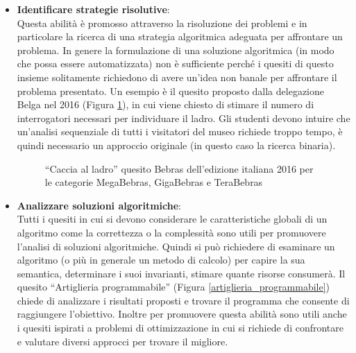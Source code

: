 \documentclass[12pt]{report}
\begin{document}
\begin{itemize}
\bigskip
	\item \textbf{Identificare strategie risolutive}:
	\\
	Questa abilità è promosso attraverso la risoluzione dei problemi e in particolare la ricerca di una strategia algoritmica adeguata per affrontare un problema. In genere la formulazione di una soluzione algoritmica (in modo che possa essere automatizzata) non è sufficiente perché i quesiti di questo insieme solitamente richiedono di avere un'idea non banale per affrontare il problema presentato.
	Un esempio è il quesito proposto dalla delegazione Belga nel 2016 (Figura \ref{2016-BE-02}), in cui viene chiesto di stimare il numero di interrogatori necessari per individuare il ladro. Gli studenti devono intuire che un'analisi sequenziale di tutti i visitatori del museo richiede troppo tempo, è quindi necessario un approccio originale (in questo caso la ricerca binaria). 
	
	\begin{figure}[h]
		\centering
		\caption{``Caccia al ladro'' quesito Bebras dell'edizione italiana 2016 per le categorie MegaBebras, GigaBebras e TeraBebras}\label{2016-BE-02}
	\end{figure}
	
\bigskip
	\item \textbf{Analizzare soluzioni algoritmiche}: 
	\\
	Tutti i quesiti in cui si devono considerare le caratteristiche globali di un algoritmo come la correttezza o la complessità sono utili per promuovere l'analisi di soluzioni algoritmiche. Quindi si può richiedere di esaminare un algoritmo (o più in generale un metodo di calcolo) per capire la sua semantica, determinare i suoi invarianti, stimare quante risorse consumerà. 
	Il quesito ``Artiglieria programmabile'' (Figura \ref{artiglieria_programmabile}) chiede di analizzare i risultati proposti e trovare il programma che consente di raggiungere l'obiettivo. 
	Inoltre per promuovere questa abilità sono utili anche i quesiti ispirati a problemi di ottimizzazione in cui si richiede di confrontare e valutare diversi approcci per trovare il migliore.
	

\end{itemize}
\end{document}
